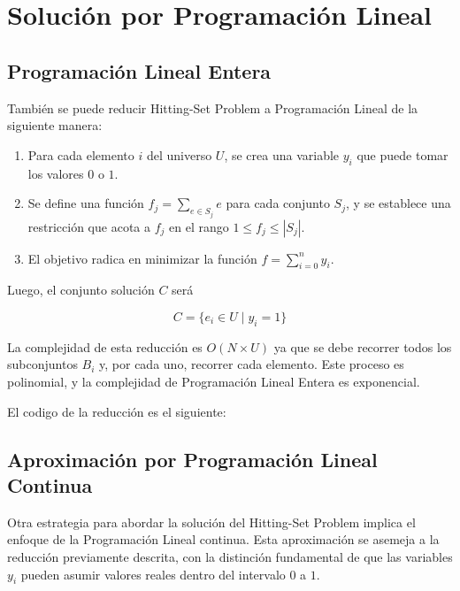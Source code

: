 \section{Solución por Programación Lineal}

\subsection{Programación Lineal Entera}

También se puede reducir Hitting-Set Problem a Programación Lineal de la siguiente manera:

\begin{enumerate}

    \item Para cada elemento $i$ del universo $U$, se crea una variable $y_{i}$ que puede tomar los valores $0$ o $1$.
    
    \item Se define una función \(f_{j} = \sum_{e \in S_j} e\) para cada conjunto \(S_{j}\), y se establece una restricción que acota a \(f_{j}\) en el rango \(1 \leq f_{j} \leq |S_{j}|\).


    \item  El objetivo radica en minimizar la función $f=\sum_{i=0}^{n}y_{i}$.

\end{enumerate}

Luego, el conjunto solución $C$ será

\[
    C = \{e_i \in U \mid y_{i} = 1\}
\]

La complejidad de esta reducción es $O(N \times U)$ ya que se debe recorrer todos los subconjuntos $B_i$ y, por cada uno, recorrer cada elemento. Este proceso es polinomial, y la complejidad de Programación Lineal Entera es exponencial.

El codigo de la reducción es el siguiente:



\subsection{Aproximación por Programación Lineal Continua}

Otra estrategia para abordar la solución del Hitting-Set Problem implica el enfoque de la Programación Lineal continua. Esta aproximación se asemeja a la reducción previamente descrita, con la distinción fundamental de que las variables 
$y_i$ pueden asumir valores reales dentro del intervalo $0$ a $1$.


